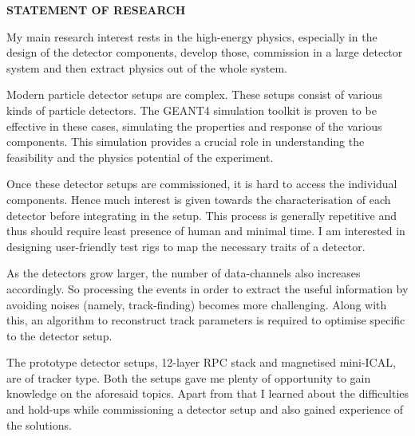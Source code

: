 \documentclass[12pt]{article}
\begin{document}
\pagebreak
\vspace{0.4cm}
\colorbox{gray!40}{\begin{minipage}{17.5cm}
\bf { STATEMENT OF RESEARCH } 
\end{minipage} }
\begin{minipage}{1.05\textwidth}
\vspace{0.4cm}
\hspace{0.5cm}
My main research interest rests in the high-energy physics, especially
in the design of the detector components, develop those, commission in
a large detector system and then extract physics out of the whole
system.

\hspace{0.5cm}
Modern particle detector setups are complex. These
setups consist of various kinds of particle detectors.
The GEANT4 simulation toolkit is proven to be effective in these
cases, simulating the properties and response of the various
components. This simulation provides a crucial role in understanding
the feasibility and the physics potential of the experiment.

\hspace{0.5cm}
Once these detector setups are commissioned, it is hard to access the
individual components. Hence much interest is given towards the
characterisation of each detector before integrating in the setup.
This process is generally repetitive and thus should require least
presence of human and minimal time. I am interested in designing
user-friendly test rigs to map the necessary traits of a detector.

\hspace{0.5cm}
As the detectors grow larger, the number of data-channels also
increases accordingly. So processing the events in order to extract
the useful information by avoiding noises (namely, track-finding)
becomes more challenging. Along with this, an algorithm to reconstruct
track parameters is required to optimise specific to the detector
setup.

\hspace{0.5cm}
The prototype detector setups, 12-layer RPC stack and magnetised
mini-ICAL, are of tracker type. Both the setups gave me plenty of
opportunity to gain knowledge on the aforesaid topics. Apart from
that I learned about the difficulties and hold-ups while commissioning
a detector setup and also gained experience of the solutions.


\end{minipage}
\end{document}
